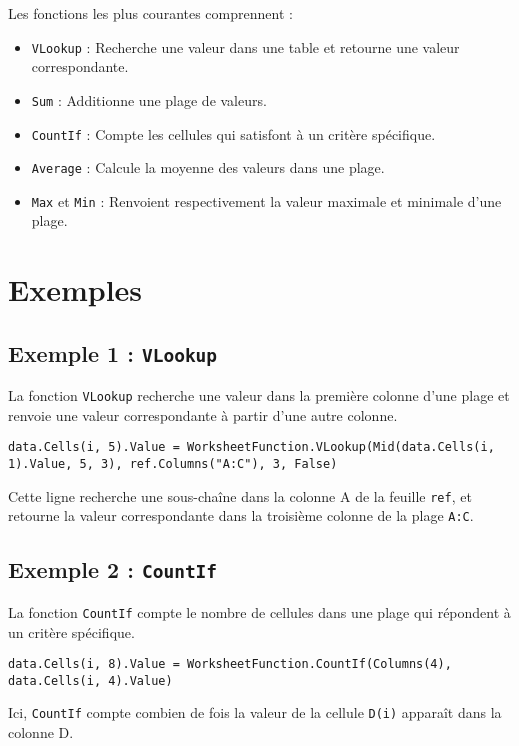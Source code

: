 \documentclass[a4paper,12pt]{report}
\begin{document}
Les fonctions les plus courantes comprennent :
\begin{itemize}
	\item \texttt{VLookup} : Recherche une valeur dans une table et retourne une valeur correspondante.
	\item \texttt{Sum} : Additionne une plage de valeurs.
	\item \texttt{CountIf} : Compte les cellules qui satisfont à un critère spécifique.
	\item \texttt{Average} : Calcule la moyenne des valeurs dans une plage.
	\item \texttt{Max} et \texttt{Min} : Renvoient respectivement la valeur maximale et minimale d'une plage.
\end{itemize}

\section{Exemples}
\subsection{Exemple 1 : \texttt{VLookup}}
La fonction \texttt{VLookup} recherche une valeur dans la première colonne d'une plage et renvoie une valeur correspondante à partir d'une autre colonne.
\newpage
\begin{lstlisting}[language=VBScript]
	data.Cells(i, 5).Value = WorksheetFunction.VLookup(Mid(data.Cells(i, 1).Value, 5, 3), ref.Columns("A:C"), 3, False)
\end{lstlisting}

Cette ligne recherche une sous-chaîne dans la colonne A de la feuille \texttt{ref}, et retourne la valeur correspondante dans la troisième colonne de la plage \texttt{A:C}.

\subsection{Exemple 2 : \texttt{CountIf}}
La fonction \texttt{CountIf} compte le nombre de cellules dans une plage qui répondent à un critère spécifique.

\begin{lstlisting}[language=VBScript]
	data.Cells(i, 8).Value = WorksheetFunction.CountIf(Columns(4), data.Cells(i, 4).Value)
\end{lstlisting}

Ici, \texttt{CountIf} compte combien de fois la valeur de la cellule \texttt{D(i)} apparaît dans la colonne D.
\end{document}
